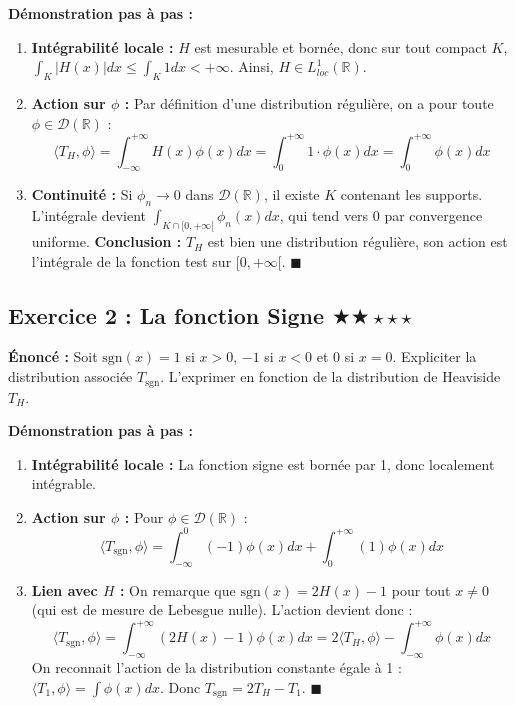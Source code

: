 \documentclass[11pt,a4paper]{article}
\begin{document}
\textbf{Démonstration pas à pas :}
\begin{enumerate}
\item \textbf{Intégrabilité locale :} $H$ est mesurable et bornée, donc sur tout compact $K$, $\int_K |H(x)| dx \le \int_K 1 dx < +\infty$. Ainsi, $H \in L^1_{loc}(\mathbb{R})$.
\item \textbf{Action sur $\phi$ :} Par définition d'une distribution régulière, on a pour toute $\phi \in \mathcal{D}(\mathbb{R})$ :
   $$ \langle T_H, \phi \rangle = \int_{-\infty}^{+\infty} H(x) \phi(x) dx = \int_0^{+\infty} 1 \cdot \phi(x) dx = \int_0^{+\infty} \phi(x) dx $$
\item \textbf{Continuité :} Si $\phi_n \to 0$ dans $\mathcal{D}(\mathbb{R})$, il existe $K$ contenant les supports. L'intégrale devient $\int_{K \cap [0, +\infty[} \phi_n(x) dx$, qui tend vers 0 par convergence uniforme.
\textbf{Conclusion :} $T_H$ est bien une distribution régulière, son action est l'intégrale de la fonction test sur $[0, +\infty[$. $\blacksquare$
\end{enumerate}




\subsection*{Exercice 2 : La fonction Signe \quad $\bigstar\bigstar\star\star\star$}

\textbf{Énoncé :}
Soit $\text{sgn}(x) = 1$ si $x > 0$, $-1$ si $x < 0$ et $0$ si $x = 0$. Expliciter la distribution associée $T_{\text{sgn}}$. L'exprimer en fonction de la distribution de Heaviside $T_H$.

\textbf{Démonstration pas à pas :}
\begin{enumerate}
\item \textbf{Intégrabilité locale :} La fonction signe est bornée par 1, donc localement intégrable.
\item \textbf{Action sur $\phi$ :} Pour $\phi \in \mathcal{D}(\mathbb{R})$ :
   $$ \langle T_{\text{sgn}}, \phi \rangle = \int_{-\infty}^{0} (-1)\phi(x) dx + \int_{0}^{+\infty} (1)\phi(x) dx $$
\item \textbf{Lien avec $H$ :} On remarque que $\text{sgn}(x) = 2H(x) - 1$ pour tout $x \ne 0$ (qui est de mesure de Lebesgue nulle).
   L'action devient donc :
   $$ \langle T_{\text{sgn}}, \phi \rangle = \int_{-\infty}^{+\infty} (2H(x) - 1)\phi(x) dx = 2\langle T_H, \phi \rangle - \int_{-\infty}^{+\infty} \phi(x) dx $$
   On reconnait l'action de la distribution constante égale à 1 : $\langle T_1, \phi \rangle = \int \phi(x) dx$.
   Donc $T_{\text{sgn}} = 2T_H - T_1$. $\blacksquare$
\end{enumerate}
\end{document}
